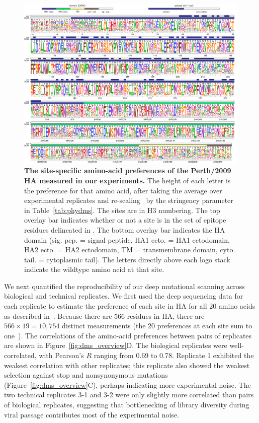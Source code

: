 \documentclass[9pt,twocolumn,twoside]{pnas-new-for-biorxiv}
\begin{document}
\begin{figure}[ht]
\centering
\includegraphics[width=17cm]{figs/prefslogoplot/rescaled-avgprefs_prefs.pdf}
\caption{\label{fig:logoplot}
{\bf The site-specific amino-acid preferences of the Perth/2009 HA measured in our experiments.}
The height of each letter is the preference for that amino acid, after taking the average over experimental replicates and re-scaling~\cite{hilton2017phydms} by the stringency parameter in Table~\ref{tab:phydms}.
The sites are in H3 numbering.
The top overlay bar indicates whether or not a site is in the set of epitope residues delineated in \cite{wolf2006long}.
The bottom overlay bar indicates the HA domain (sig. pep. = signal peptide, HA1 ecto. = HA1 ectodomain, HA2 ecto. = HA2 ectodomain, TM = transmembrane domain, cyto. tail. = cytoplasmic tail).
The letters directly above each logo stack indicate the wildtype amino acid at that site.
}
\end{figure}

We next quantified the reproducibility of our deep mutational scanning across biological and technical replicates.
We first used the deep sequencing data for each replicate to estimate the preference of each site in HA for all 20 amino acids as described in~\cite{bloom2015software}.
Because there are 566 residues in HA, there are $566 \times 19 = 10,754$ distinct measurements (the 20 preferences at each site sum to one~\cite{bloom2015software}).
The correlations of the amino-acid preferences between pairs of replicates are shown in Figure~\ref{fig:dms_overview}D.
The biological replicates were well-correlated, with Pearson's $R$ ranging from 0.69 to 0.78.
Replicate 1 exhibited the weakest correlation with other replicates; this replicate also showed the weakest selection against stop and nonsynonymous mutations (Figure~\ref{fig:dms_overview}C), perhaps indicating more experimental noise.
The two technical replicates 3-1 and 3-2 were only slightly more correlated than pairs of biological replicates, suggesting that bottlenecking of library diversity during viral passage contributes most of the experimental noise.
\end{document}

